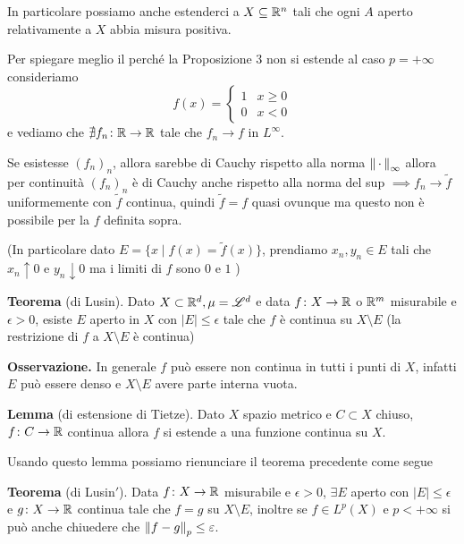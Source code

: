 \documentclass[a4paper, 12pt]{report}
\begin{document}
\begin{wrapfigure}{r}{125pt}
	\centering
	\vspace{-2.5\baselineskip}
	\vspace{-3.5\baselineskip}
\end{wrapfigure}

In particolare possiamo anche estenderci a $X \subseteq \mathbb R^n$ tali che ogni $A$ aperto relativamente a $X$ abbia misura positiva.

Per spiegare meglio il perché la Proposizione 3 non si estende al caso $p = +\infty$ consideriamo
$$
f(x) =
\begin{cases}
	1 & x \geq 0 \\
	0 & x < 0
\end{cases}
$$
e vediamo che $\nexists f_n \colon \mathbb R \to \mathbb R$ tale che $f_n \to f$ in $L^\infty$. 

Se esistesse $(f_n)_n$, allora sarebbe di Cauchy rispetto alla norma $\left\lVert \,\cdot\, \right\rVert_\infty$ allora per continuità $(f_n)_n$ è di Cauchy anche rispetto alla norma del sup $\implies f_n \to \tilde f$ uniformemente con $\tilde f$ continua, quindi $\tilde f = f$ quasi ovunque ma questo non è possibile per la $f$ definita sopra.

(In particolare dato $E = \{ x \mid f(x) = \tilde f(x) \}$, prendiamo $x_n, y_n \in E$ tali che $x_n \uparrow 0$ e $y_n \downarrow 0$ ma i limiti di $f$ sono $0$ e $1$ \absurd)

\textbf{Teorema} (di Lusin).
Dato $X \subset \mathbb R^d, \mu = \mathscr L^d$ e data $f \colon X \to \mathbb R$ o $\mathbb R^m$ misurabile e $\epsilon > 0$, esiste $E$ aperto in $X$ con $|E| \leq \epsilon$ tale che $f$ è continua su $X \setminus E$ (la restrizione di $f$ a $X \setminus E$ è continua)

\textbf{Osservazione.} 
In generale $f$ può essere non continua in tutti i punti di $X$, infatti $E$ può essere denso e $X \setminus E$ avere parte interna vuota.

\textbf{Lemma} (di estensione di Tietze). Dato $X$ spazio metrico e $C \subset X$ chiuso, $f \colon C \to \mathbb R$ continua allora $f$ si estende a una funzione continua su $X$.

Usando questo lemma possiamo rienunciare il teorema precedente come segue

\textbf{Teorema} (di Lusin$'$).
Data $f \colon X \to \mathbb R$ misurabile e $\epsilon > 0$, $\exists E$ aperto con $|E| \leq \epsilon$ e $g \colon X \to \mathbb R$ continua tale che $f = g$ su $X \setminus E$, inoltre se $f \in L^p(X)$ e $p < +\infty$ si può anche chiuedere che $\left\lVert f - g \right\rVert_p \leq \varepsilon$.
\end{document}
